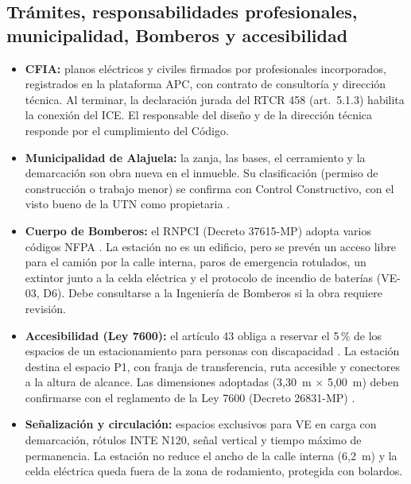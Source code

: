 \subsection{Trámites, responsabilidades profesionales, municipalidad, Bomberos y accesibilidad}
\begin{itemize}
\item \textbf{CFIA:} planos eléctricos y civiles firmados por profesionales incorporados, registrados en la plataforma APC, con contrato de consultoría y dirección técnica. Al terminar, la declaración jurada del RTCR 458 (art.~5.1.3) habilita la conexión del ICE. El responsable del diseño y de la dirección técnica responde por el cumplimiento del Código.
\item \textbf{Municipalidad de Alajuela:} la zanja, las bases, el cerramiento y la demarcación son obra nueva en el inmueble. Su clasificación (permiso de construcción o trabajo menor) se confirma con Control Constructivo, con el visto bueno de la UTN como propietaria \cite{muniAlajuela}.
\item \textbf{Cuerpo de Bomberos:} el RNPCI (Decreto 37615-MP) adopta varios códigos NFPA \cite{rnpci}. La estación no es un edificio, pero se prevén un acceso libre para el camión por la calle interna, paros de emergencia rotulados, un extintor junto a la celda eléctrica \supuesto{} y el protocolo de incendio de baterías (VE-03, D6). Debe consultarse a la Ingeniería de Bomberos si la obra requiere revisión.
\item \textbf{Accesibilidad (Ley 7600):} el artículo 43 obliga a reservar el 5\,\% de los espacios de un estacionamiento para personas con discapacidad \cite{ley7600nota}. La estación destina el espacio P1, con franja de transferencia, ruta accesible y conectores a la altura de alcance. Las dimensiones adoptadas (3,30~m $\times$ 5,00~m) deben confirmarse con el reglamento de la Ley 7600 (Decreto 26831-MP) \supuesto{}.
\item \textbf{Señalización y circulación:} espacios exclusivos para VE en carga con demarcación, rótulos INTE N120, señal vertical y tiempo máximo de permanencia. La estación no reduce el ancho de la calle interna (6,2~m) y la celda eléctrica queda fuera de la zona de rodamiento, protegida con bolardos.
\end{itemize}

